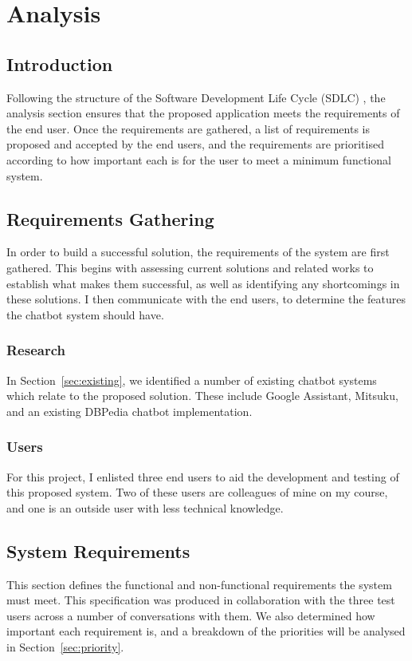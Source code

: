 \chapter{Analysis}
\label{ch:analysis}
\section{Introduction}
Following the structure of the Software Development Life Cycle (SDLC) , the analysis section ensures that the proposed application meets the requirements of the end user. Once the requirements are gathered, a list of requirements is proposed and accepted by the end users, and the requirements are prioritised according to how important each is for the user to meet a minimum functional system.

\section{Requirements Gathering}
In order to build a successful solution, the requirements of the system are first gathered. This begins with assessing current solutions and related works to establish what makes them successful, as well as identifying any shortcomings in these solutions. I then communicate with the end users, to determine the features the chatbot system should have.

\subsection{Research}
In Section~\ref{sec:existing}, we identified a number of existing chatbot systems which relate to the proposed solution. These include Google Assistant, Mitsuku, and an existing DBPedia chatbot implementation.

\subsection{Users}
For this project, I enlisted three end users to aid the development and testing of this proposed system. Two of these users are colleagues of mine on my course, and one is an outside user with less technical knowledge.

\newpage
\section{System Requirements}
\label{sec:requirements}
This section defines the functional and non-functional requirements the system must meet. This specification was produced in collaboration with the three test users across a number of conversations with them. We also determined how important each requirement is, and a breakdown of the priorities will be analysed in Section~\ref{sec:priority}.

